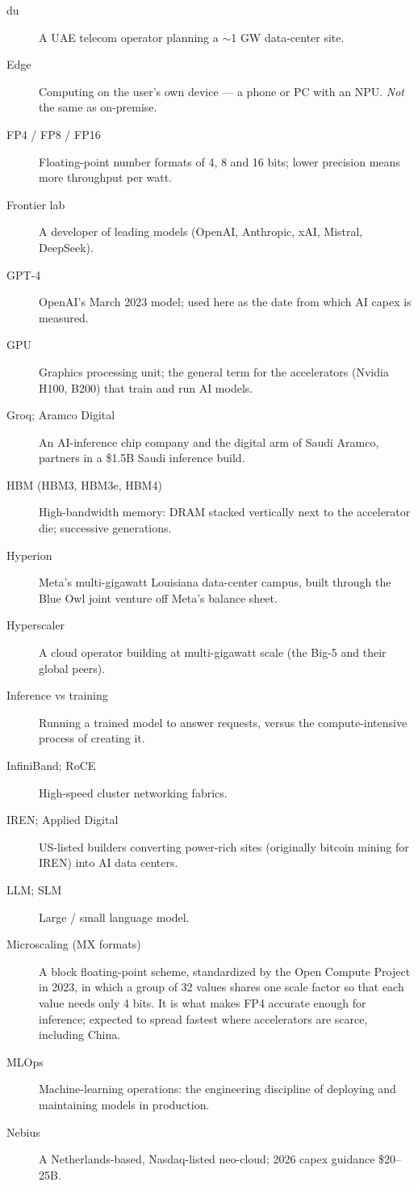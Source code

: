 \documentclass[11pt,letterpaper]{article}
\begin{document}
\begin{description}
\item[du] A UAE telecom operator planning a $\sim$1 GW data-center site.
\item[Edge] Computing on the user's own device --- a phone or PC with an NPU. \emph{Not} the same as on-premise.
\item[FP4 / FP8 / FP16] Floating-point number formats of 4, 8 and 16 bits; lower precision means more throughput per watt.
\item[Frontier lab] A developer of leading models (OpenAI, Anthropic, xAI, Mistral, DeepSeek).
\item[GPT-4] OpenAI's March 2023 model; used here as the date from which AI capex is measured.
\item[GPU] Graphics processing unit; the general term for the accelerators (Nvidia H100, B200) that train and run AI models.
\item[Groq; Aramco Digital] An AI-inference chip company and the digital arm of Saudi Aramco, partners in a \$1.5B Saudi inference build.
\item[HBM (HBM3, HBM3e, HBM4)] High-bandwidth memory: DRAM stacked vertically next to the accelerator die; successive generations.
\item[Hyperion] Meta's multi-gigawatt Louisiana data-center campus, built through the Blue Owl joint venture off Meta's balance sheet.
\item[Hyperscaler] A cloud operator building at multi-gigawatt scale (the Big-5 and their global peers).
\item[Inference vs training] Running a trained model to answer requests, versus the compute-intensive process of creating it.
\item[InfiniBand; RoCE] High-speed cluster networking fabrics.
\item[IREN; Applied Digital] US-listed builders converting power-rich sites (originally bitcoin mining for IREN) into AI data centers.
\item[LLM; SLM] Large / small language model.
\item[Microscaling (MX formats)] A block floating-point scheme, standardized by the Open Compute Project in 2023, in which a group of 32 values shares one scale factor so that each value needs only 4 bits. It is what makes FP4 accurate enough for inference; expected to spread fastest where accelerators are scarce, including China.
\item[MLOps] Machine-learning operations: the engineering discipline of deploying and maintaining models in production.
\item[Nebius] A Netherlands-based, Nasdaq-listed neo-cloud; 2026 capex guidance \$20--25B.

\end{description}
\end{document}
